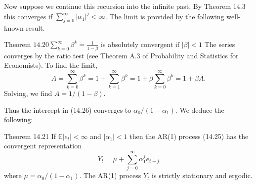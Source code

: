 \documentclass[10pt]{article}
\begin{document}
Now suppose we continue this recursion into the infinite past. By Theorem $14.3$ this converges if $\sum_{j=0}^{\infty}\left|\alpha_{1}\right|^{j}<\infty$. The limit is provided by the following well-known result.

Theorem $14.20 \sum_{k=0}^{\infty} \beta^{k}=\frac{1}{1-\beta}$ is absolutely convergent if $|\beta|<1$ The series converges by the ratio test (see Theorem A.3 of Probability and Statistics for Economists). To find the limit,
$$
A=\sum_{k=0}^{\infty} \beta^{k}=1+\sum_{k=1}^{\infty} \beta^{k}=1+\beta \sum_{k=0}^{\infty} \beta^{k}=1+\beta A .
$$
Solving, we find $A=1 /(1-\beta)$.

Thus the intercept in (14.26) converges to $\alpha_{0} /\left(1-\alpha_{1}\right)$. We deduce the following:

Theorem 14.21 If $\mathbb{E}\left|e_{t}\right|<\infty$ and $\left|\alpha_{1}\right|<1$ then the AR(1) process (14.25) has the convergent representation
$$
Y_{t}=\mu+\sum_{j=0}^{\infty} \alpha_{1}^{j} e_{t-j}
$$
where $\mu=\alpha_{0} /\left(1-\alpha_{1}\right)$. The AR(1) process $Y_{t}$ is strictly stationary and ergodic.
\end{document}
